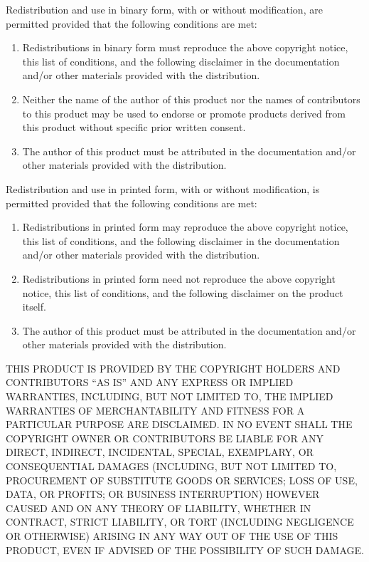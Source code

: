 \documentclass[a4paper,english]{report}
\numberwithin{equation}{section}
\begin{document}
Redistribution and use in binary form, with or without modification,
are permitted provided that the following conditions are met:

\begin{enumerate}
\item Redistributions in binary form must reproduce the above copyright
   notice, this list of conditions, and the following disclaimer in the
   documentation and/or other materials provided with the distribution.
\item Neither the name of the author of this product nor the names of
   contributors to this product may be used to endorse or promote
   products derived from this product without specific prior written
   consent.
\item The author of this product must be attributed in the documentation
   and/or other materials provided with the distribution.
\end{enumerate}

Redistribution and use in printed form, with or without modification,
is permitted provided that the following conditions are met:

\begin{enumerate}
\item Redistributions in printed form may reproduce the above copyright
   notice, this list of conditions, and the following disclaimer in the
   documentation and/or other materials provided with the distribution.
\item Redistributions in printed form need not reproduce the above
   copyright notice, this list of conditions, and the following
   disclaimer on the product itself.
\item The author of this product must be attributed in the documentation
   and/or other materials provided with the distribution.
\end{enumerate}

THIS PRODUCT IS PROVIDED BY THE COPYRIGHT HOLDERS AND CONTRIBUTORS
“AS IS” AND ANY EXPRESS OR IMPLIED WARRANTIES, INCLUDING, BUT NOT
LIMITED TO, THE IMPLIED WARRANTIES OF MERCHANTABILITY AND FITNESS FOR
A PARTICULAR PURPOSE ARE DISCLAIMED.  IN NO EVENT SHALL THE COPYRIGHT
OWNER OR CONTRIBUTORS BE LIABLE FOR ANY DIRECT, INDIRECT, INCIDENTAL,
SPECIAL, EXEMPLARY, OR CONSEQUENTIAL DAMAGES (INCLUDING, BUT NOT
LIMITED TO, PROCUREMENT OF SUBSTITUTE GOODS OR SERVICES; LOSS OF USE,
DATA, OR PROFITS; OR BUSINESS INTERRUPTION) HOWEVER CAUSED AND ON ANY
THEORY OF LIABILITY, WHETHER IN CONTRACT, STRICT LIABILITY, OR TORT
(INCLUDING NEGLIGENCE OR OTHERWISE) ARISING IN ANY WAY OUT OF THE USE
OF THIS PRODUCT, EVEN IF ADVISED OF THE POSSIBILITY OF SUCH DAMAGE.
\end{document}
